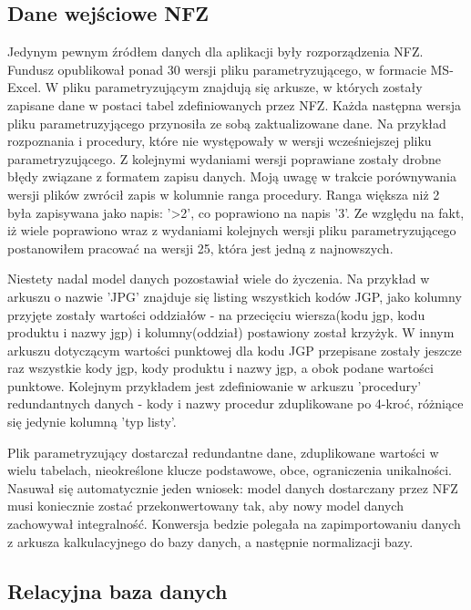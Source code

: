 \subsection{Dane wejściowe NFZ}
\label{sec:daneWejscioweNFZ}
Jedynym pewnym źródłem danych dla aplikacji były rozporządzenia NFZ. Fundusz opublikował ponad 30 wersji pliku parametryzującego, w formacie MS-Excel. W pliku parametryzującym znajdują się arkusze, w których zostały zapisane dane w postaci tabel zdefiniowanych przez NFZ. Każda następna wersja pliku parametruzyjącego przynosiła ze sobą zaktualizowane dane. Na przykład rozpoznania i procedury, które nie występowały w wersji wcześniejszej pliku parametryzującego. Z kolejnymi wydaniami wersji poprawiane zostały drobne błędy związane z formatem zapisu danych. Moją uwagę w trakcie porównywania wersji plików zwrócił zapis w kolumnie ranga procedury. Ranga większa niż 2 była zapisywana jako napis: '>2', co poprawiono na napis '3'. Ze względu na fakt, iż wiele poprawiono wraz z wydaniami kolejnych wersji pliku parametryzującego postanowiłem pracować na wersji 25, która jest jedną z najnowszych. 

Niestety nadal model danych pozostawiał wiele do życzenia. Na przykład w arkuszu o nazwie 'JPG' znajduje się listing wszystkich kodów JGP, jako kolumny przyjęte zostały wartości oddziałów - na przecięciu wiersza(kodu jgp, kodu produktu i nazwy jgp) i kolumny(oddział) postawiony został krzyżyk. W innym arkuszu dotyczącym wartości punktowej dla kodu JGP przepisane zostały jeszcze raz wszystkie kody jgp, kody produktu i nazwy jgp, a obok podane wartości punktowe. Kolejnym przykładem jest zdefiniowanie w arkuszu 'procedury' redundantnych danych - kody i nazwy procedur zduplikowane po 4-kroć, różniące się jedynie kolumną 'typ listy'.

Plik parametryzujący dostarczał redundantne dane, zduplikowane wartości w wielu tabelach, nieokreślone klucze podstawowe, obce, ograniczenia unikalności. Nasuwał się automatycznie jeden wniosek: model danych dostarczany przez NFZ musi koniecznie zostać przekonwertowany tak, aby nowy model danych zachowywał integralność. Konwersja bedzie polegała na zapimportowaniu danych z arkusza kalkulacyjnego do bazy danych, a następnie normalizacji bazy.

\subsection{Relacyjna baza danych}
\label{sec:relacyjnaBazaDanych}

